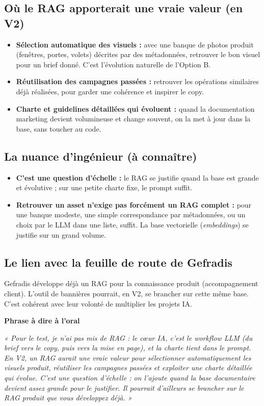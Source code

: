 \documentclass[11pt,a4paper]{article}
\newcommand{\phrasea}[1]{%
  \begin{phrasebox}
  {\bfseries\color{gefblue}\textsf{Phrase à dire à l'oral}}\par\smallskip
  \itshape #1
  \end{phrasebox}%
}
\begin{document}
\subsection{Où le RAG apporterait une vraie valeur (en V2)}
\begin{itemize}[leftmargin=1.4em]
  \item \textbf{Sélection automatique des visuels :} avec une banque de photos
        produit (fenêtres, portes, volets) décrites par des métadonnées, retrouver
        le bon visuel pour un brief donné. C'est l'évolution naturelle de
        l'Option B.
  \item \textbf{Réutilisation des campagnes passées :} retrouver les opérations
        similaires déjà réalisées, pour garder une cohérence et inspirer le copy.
  \item \textbf{Charte et guidelines détaillées qui évoluent :} quand la
        documentation marketing devient volumineuse et change souvent, on la met à
        jour dans la base, sans toucher au code.
\end{itemize}

\subsection{La nuance d'ingénieur (à connaître)}
\begin{itemize}[leftmargin=1.4em]
  \item \textbf{C'est une question d'échelle :} le RAG se justifie quand la base
        est grande et évolutive ; sur une petite charte fixe, le prompt suffit.
  \item \textbf{Retrouver un asset n'exige pas forcément un RAG complet :} pour une
        banque modeste, une simple correspondance par métadonnées, ou un choix par
        le LLM dans une liste, suffit. La base vectorielle (\emph{embeddings}) se
        justifie sur un grand volume.
\end{itemize}

\subsection{Le lien avec la feuille de route de Gefradis}
Gefradis développe déjà un RAG pour la connaissance produit (accompagnement
client). L'outil de bannières pourrait, en V2, se brancher sur cette même base.
C'est cohérent avec leur volonté de multiplier les projets IA.

\phrasea{« Pour le test, je n'ai pas mis de RAG : le cœur IA, c'est le workflow LLM
(du brief vers le copy, puis vers la mise en page), et la charte tient dans le
prompt. En V2, un RAG aurait une vraie valeur pour sélectionner automatiquement les
visuels produit, réutiliser les campagnes passées et exploiter une charte détaillée
qui évolue. C'est une question d'échelle : on l'ajoute quand la base documentaire
devient assez grande pour le justifier. Il pourrait d'ailleurs se brancher sur le
RAG produit que vous développez déjà. »}
\end{document}
